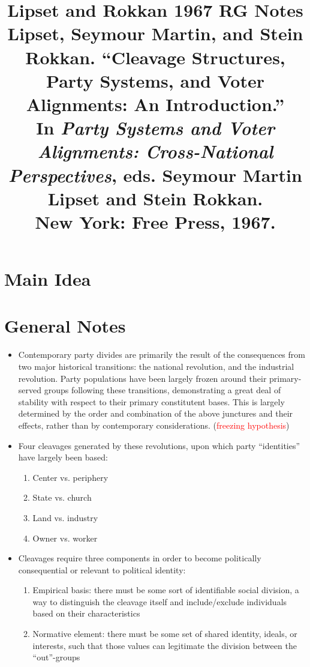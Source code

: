 \documentclass[12pt]{article}
\title{\textbf{Lipset and Rokkan 1967 RG Notes}\\
\large Lipset, Seymour Martin, and Stein Rokkan. ``Cleavage Structures, Party Systems, and Voter Alignments: An Introduction.''\\
In \textit{Party Systems and Voter Alignments: Cross-National Perspectives}, eds. Seymour Martin Lipset and Stein Rokkan.\\
New York: Free Press, 1967.}
\author{}
\date{}
\begin{document}
\maketitle

\section{Main Idea}



\section{General Notes}

\begin{itemize}[leftmargin=*, itemsep=4pt]
    \item Contemporary party divides are primarily the result of the consequences from two major historical transitions: the national revolution, and the industrial revolution. Party populations have been largely frozen around their primary-served groups following these transitions, demonstrating a great deal of stability with respect to their primary constitutent bases. This is largely determined by the order and combination of the above junctures and their effects, rather than by contemporary considerations. (\textcolor{red}{freezing hypothesis})
    \item Four cleavages generated by these revolutions, upon which party ``identities'' have largely been based:
    \begin{enumerate}
        \item Center vs. periphery
        \item State vs. church
        \item Land vs. industry
        \item Owner vs. worker
    \end{enumerate}
    \item Cleavages require three components in order to become politically consequential or relevant to political identity:
    \begin{enumerate}
        \item Empirical basis: there must be some sort of identifiable social division, a way to distinguish the cleavage itself and include/exclude individuals based on their characteristics
        \item Normative element: there must be some set of shared identity, ideals, or interests, such that those values can legitimate the division between the ``out''-groups

\end{enumerate}
\end{itemize}
\end{document}
